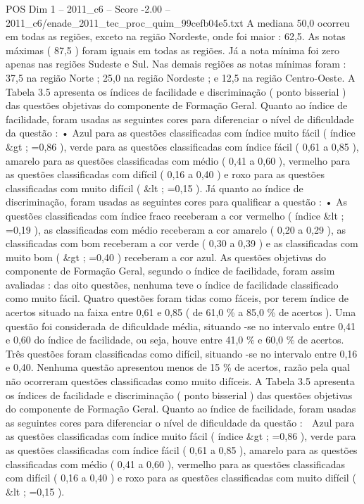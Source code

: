 \begin{textsample}{POS Dim 1 – 2011\_c6 – Score -2.00 – 2011\_c6/enade\_2011\_tec\_proc\_quim\_99cefb04e5.txt}
A mediana 50,0 ocorreu em todas as regiões, exceto na região Nordeste, onde foi maior : 62,5.
As notas máximas ( 87,5 ) foram iguais em todas as regiões.
Já a nota mínima foi zero apenas nas regiões Sudeste e Sul.
Nas demais regiões as notas mínimas foram : 37,5 na região Norte ; 25,0 na região Nordeste ; e 12,5 na região Centro-Oeste.
A Tabela 3.5 apresenta os índices de facilidade e discriminação ( ponto bisserial ) das questões objetivas do componente de Formação Geral.
Quanto ao índice de facilidade, foram usadas as seguintes cores para diferenciar o nível de dificuldade da questão : • Azul para as questões classificadas com índice muito fácil ( índice \&gt ; =0,86 ), verde para as questões classificadas com índice fácil ( 0,61 a 0,85 ), amarelo para as questões classificadas com médio ( 0,41 a 0,60 ), vermelho para as questões classificadas com difícil ( 0,16 a 0,40 ) e roxo para as questões classificadas com muito difícil ( \&lt ; =0,15 ).
Já quanto ao índice de discriminação, foram usadas as seguintes cores para qualificar a questão : • As questões classificadas com índice fraco receberam a cor vermelho ( índice \&lt ; =0,19 ), as classificadas com médio receberam a cor amarelo ( 0,20 a 0,29 ), as classificadas com bom receberam a cor verde ( 0,30 a 0,39 ) e as classificadas com muito bom ( \&gt ; =0,40 ) receberam a cor azul.
As questões objetivas do componente de Formação Geral, segundo o índice de facilidade, foram assim avaliadas : das oito questões, nenhuma teve o índice de facilidade classificado como muito fácil.
Quatro questões foram tidas como fáceis, por terem índice de acertos situado na faixa entre 0,61 e 0,85 ( de 61,0 \% a 85,0 \% de acertos ).
Uma questão foi considerada de dificuldade média, situando -se no intervalo entre 0,41 e 0,60 do índice de facilidade, ou seja, houve entre 41,0 \% e 60,0 \% de acertos.
Três questões foram classificadas como difícil, situando -se no intervalo entre 0,16 e 0,40.
Nenhuma questão apresentou menos de 15 \% de acertos, razão pela qual não ocorreram questões classificadas como muito difíceis.
A Tabela 3.5 apresenta os índices de facilidade e discriminação ( ponto bisserial ) das questões objetivas do componente de Formação Geral.
Quanto ao índice de facilidade, foram usadas as seguintes cores para diferenciar o nível de dificuldade da questão :  Azul para as questões classificadas com índice muito fácil ( índice \&gt ; =0,86 ), verde para as questões classificadas com índice fácil ( 0,61 a 0,85 ), amarelo para as questões classificadas com médio ( 0,41 a 0,60 ), vermelho para as questões classificadas com difícil ( 0,16 a 0,40 ) e roxo para as questões classificadas com muito difícil ( \&lt ; =0,15 ).

\end{textsample}
